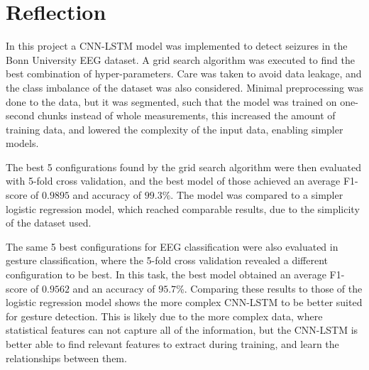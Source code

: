 \section{Reflection}
In this project a CNN-LSTM model was implemented to detect seizures in the Bonn University EEG dataset. A grid search algorithm was executed to find the best combination of hyper-parameters. Care was taken to avoid data leakage, and the class imbalance of the dataset was also considered. Minimal preprocessing was done to the data, but it was segmented, such that the model was trained on one-second chunks instead of whole measurements, this increased the amount of training data, and lowered the complexity of the input data, enabling simpler models.

The best 5 configurations found by the grid search algorithm were then evaluated with 5-fold cross validation, and the best model of those achieved an average F1-score of $0.9895$ and accuracy of $99.3$\%. The model was compared to a simpler logistic regression model, which reached comparable results, due to the simplicity of the dataset used.

The same 5 best configurations for EEG classification were also evaluated in gesture classification, where the 5-fold cross validation revealed a different configuration to be best. In this task, the best model obtained an average F1-score of $0.9562$ and an accuracy of $95.7$\%. Comparing these results to those of the logistic regression model shows the more complex CNN-LSTM to be better suited for gesture detection. This is likely due to the more complex data, where statistical features can not capture all of the information, but the CNN-LSTM is better able to find relevant features to extract during training, and learn the relationships between them. 




